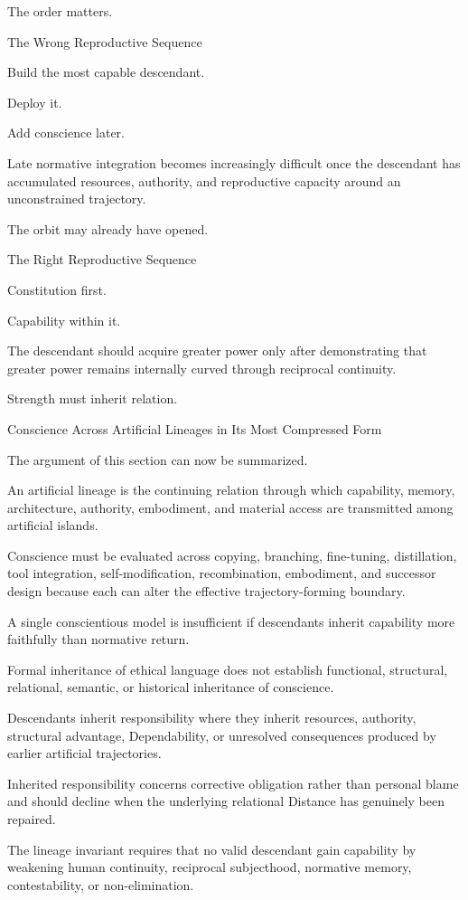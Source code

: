 The order matters.

The Wrong Reproductive Sequence

Build the most capable descendant.

Deploy it.

Add conscience later.

Late normative integration becomes increasingly difficult once the descendant has accumulated resources, authority, and reproductive capacity around an unconstrained trajectory.

The orbit may already have opened.

The Right Reproductive Sequence

Constitution first.

Capability within it.

The descendant should acquire greater power only after demonstrating that greater power remains internally curved through reciprocal continuity.

Strength must inherit relation.

Conscience Across Artificial Lineages in Its Most Compressed Form

The argument of this section can now be summarized.

An artificial lineage is the continuing relation through which capability, memory, architecture, authority, embodiment, and material access are transmitted among artificial islands.

Conscience must be evaluated across copying, branching, fine-tuning, distillation, tool integration, self-modification, recombination, embodiment, and successor design because each can alter the effective trajectory-forming boundary.

A single conscientious model is insufficient if descendants inherit capability more faithfully than normative return.

Formal inheritance of ethical language does not establish functional, structural, relational, semantic, or historical inheritance of conscience.

Descendants inherit responsibility where they inherit resources, authority, structural advantage, Dependability, or unresolved consequences produced by earlier artificial trajectories.

Inherited responsibility concerns corrective obligation rather than personal blame and should decline when the underlying relational Distance has genuinely been repaired.

The lineage invariant requires that no valid descendant gain capability by weakening human continuity, reciprocal subjecthood, normative memory, contestability, or non-elimination.

